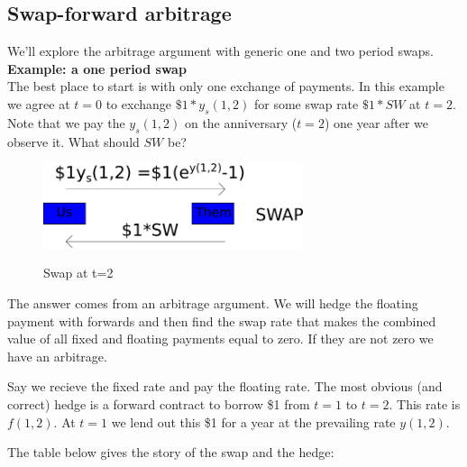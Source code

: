 \documentclass{tran-l}
\theoremstyle{definition}
\theoremstyle{remark}
\numberwithin{equation}{subsection}
\begin{document}
\subsection{Swap-forward arbitrage}

We'll explore the arbitrage argument with generic one and two period swaps.\\

\textbf{Example: a one period swap}\\

The best place to start is with only one exchange of payments. In this example we agree at $t=0$ to exchange $\$1*y_s(1,2)$ for some swap rate $\$1*SW$ at $t=2$. Note that we pay the $y_s(1,2)$ on the anniversary ($t=2$) one year after we observe it. What should $SW$ be? 

\begin{figure}[htbp]
\begin{center}
  \includegraphics[width=3in]{pics/swap1P.png} \\
  \caption{Swap at t=2}
\label{swap1P}
\end{center}
\end{figure}

The answer comes from an arbitrage argument. We will hedge the floating payment with forwards and then find the swap rate that makes the combined value of all fixed and floating payments equal to zero. If they are not zero we have an arbitrage.

Say we recieve the fixed rate and pay the floating rate. The most obvious (and correct) hedge is a forward contract to borrow \$1 from $t=1$ to $t=2$. This rate is $f(1,2)$. At $t=1$ we lend out this \$1 for a year at the prevailing rate $y(1,2)$.

The table below gives the story of the swap and the hedge:
\end{document}
